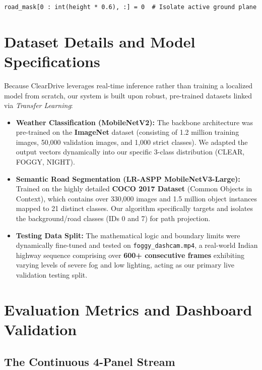 \documentclass[12pt, a4paper]{article}
\begin{document}
\begin{lstlisting}
road_mask[0 : int(height * 0.6), :] = 0  # Isolate active ground plane
\end{lstlisting}

\section{Dataset Details and Model Specifications}

Because ClearDrive leverages real-time inference rather than training a localized model from scratch, our system is built upon robust, pre-trained datasets linked via \textit{Transfer Learning}:

\begin{itemize}
    \item \textbf{Weather Classification (MobileNetV2):} 
    The backbone architecture was pre-trained on the \textbf{ImageNet} dataset (consisting of 1.2 million training images, 50,000 validation images, and 1,000 strict classes). We adapted the output vectors dynamically into our specific 3-class distribution (CLEAR, FOGGY, NIGHT).
    \item \textbf{Semantic Road Segmentation (LR-ASPP MobileNetV3-Large):}
    Trained on the highly detailed \textbf{COCO 2017 Dataset} (Common Objects in Context), which contains over 330,000 images and 1.5 million object instances mapped to 21 distinct classes. Our algorithm specifically targets and isolates the background/road classes (IDs 0 and 7) for path projection.
    \item \textbf{Testing Data Split:}
    The mathematical logic and boundary limits were dynamically fine-tuned and tested on \texttt{foggy\_dashcam.mp4}, a real-world Indian highway sequence comprising over \textbf{600+ consecutive frames} exhibiting varying levels of severe fog and low lighting, acting as our primary live validation testing split.
\end{itemize}

\section{Evaluation Metrics and Dashboard Validation}

\subsection{The Continuous 4-Panel Stream}
\end{document}

